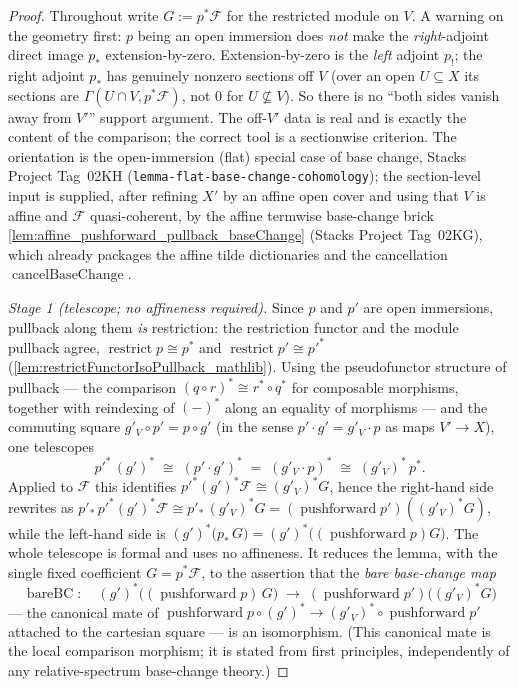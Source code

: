 \begin{proof}\leanok
  Throughout write \(G := p^*\mathcal{F}\) for the restricted module on \(V\). A warning on the
  geometry first: \(p\) being an open immersion does \emph{not} make the \emph{right}-adjoint
  direct image \(p_*\) extension-by-zero. Extension-by-zero is the \emph{left} adjoint \(p_!\);
  the right adjoint \(p_*\) has genuinely nonzero sections off \(V\) (over an open \(U \subseteq
  X\) its sections are \(\Gamma(U \cap V, p^*\mathcal{F})\), not \(0\) for \(U \not\subseteq V\)).
  So there is no ``both sides vanish away from \(V'\)'' support argument. The off-\(V'\) data is
  real and is exactly the content of the comparison; the correct tool is a sectionwise criterion.
  The orientation is the open-immersion (flat) special case of base change, Stacks Project
  Tag~02KH (\texttt{lemma-flat-base-change-cohomology}); the section-level input is
  supplied, after refining \(X'\) by an affine open cover and using that \(V\) is affine and
  \(\mathcal{F}\) quasi-coherent, by the affine termwise base-change brick
  \cref{lem:affine_pushforward_pullback_baseChange} (Stacks Project Tag~02KG), which already
  packages the affine tilde dictionaries and the cancellation
  \(\operatorname{cancelBaseChange}\).

  \emph{Stage 1 (telescope; no affineness required).} Since \(p\) and \(p'\) are open immersions,
  pullback along them \emph{is} restriction: the restriction functor and the module pullback
  agree, \(\operatorname{restrict} p \cong p^*\) and \(\operatorname{restrict} p' \cong p'^*\)
  (\cref{lem:restrictFunctorIsoPullback_mathlib}). Using the pseudofunctor structure of pullback
  --- the comparison \((q \circ r)^* \cong r^* \circ q^*\) for composable morphisms, together with
  reindexing of \((-)^*\) along an equality of morphisms --- and the commuting square
  \(g'_V \circ p' = p \circ g'\) (in the sense \(p' \cdot g' = g'_V \cdot p\) as maps
  \(V' \to X\)), one telescopes
  \[
    p'^*\,(g')^*
      \;\cong\; (p' \cdot g')^*
      \;=\; (g'_V \cdot p)^*
      \;\cong\; (g'_V)^*\,p^* .
  \]
  Applied to \(\mathcal{F}\) this identifies \(p'^*(g')^*\mathcal{F} \cong (g'_V)^* G\), hence the
  right-hand side rewrites as
  \(p'_*\,p'^*(g')^*\mathcal{F} \cong p'_*\,(g'_V)^* G = (\operatorname{pushforward} p')
  ((g'_V)^* G)\), while the left-hand side is
  \((g')^*\bigl(p_*\,G\bigr) = (g')^*\bigl((\operatorname{pushforward} p) G\bigr)\). The whole
  telescope is formal and uses no affineness. It reduces the lemma, with the single fixed
  coefficient \(G = p^*\mathcal{F}\), to the assertion that the \emph{bare base-change map}
  \[
    \operatorname{bareBC} \colon\quad
    (g')^*\bigl((\operatorname{pushforward} p)\,G\bigr)
      \;\longrightarrow\;
    (\operatorname{pushforward} p')\bigl((g'_V)^* G\bigr)
  \]
  --- the canonical mate of \(\operatorname{pushforward} p \circ (g')^* \to (g'_V)^* \circ
  \operatorname{pushforward} p'\) attached to the cartesian square --- is an isomorphism. (This
  canonical mate is the local comparison morphism; it is stated from first principles,
  independently of any relative-spectrum base-change theory.)


\end{proof}
